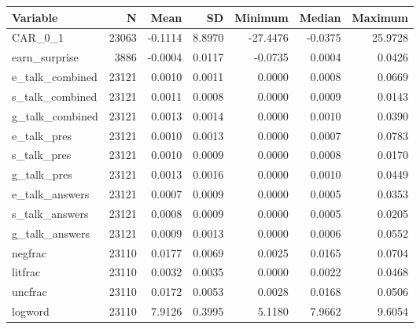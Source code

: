 \begin{tabular}{lrrrrrr}
\toprule
Variable & N & Mean & SD & Minimum & Median & Maximum \\
\midrule
CAR_0_1 & 23063 & -0.1114 & 8.8970 & -27.4476 & -0.0375 & 25.9728 \\
earn_surprise & 3886 & -0.0004 & 0.0117 & -0.0735 & 0.0004 & 0.0426 \\
e_talk_combined & 23121 & 0.0010 & 0.0011 & 0.0000 & 0.0008 & 0.0669 \\
s_talk_combined & 23121 & 0.0011 & 0.0008 & 0.0000 & 0.0009 & 0.0143 \\
g_talk_combined & 23121 & 0.0013 & 0.0014 & 0.0000 & 0.0010 & 0.0390 \\
e_talk_pres & 23121 & 0.0010 & 0.0013 & 0.0000 & 0.0007 & 0.0783 \\
s_talk_pres & 23121 & 0.0010 & 0.0009 & 0.0000 & 0.0008 & 0.0170 \\
g_talk_pres & 23121 & 0.0013 & 0.0016 & 0.0000 & 0.0010 & 0.0449 \\
e_talk_answers & 23121 & 0.0007 & 0.0009 & 0.0000 & 0.0005 & 0.0353 \\
s_talk_answers & 23121 & 0.0008 & 0.0009 & 0.0000 & 0.0005 & 0.0205 \\
g_talk_answers & 23121 & 0.0009 & 0.0013 & 0.0000 & 0.0006 & 0.0552 \\
negfrac & 23110 & 0.0177 & 0.0069 & 0.0025 & 0.0165 & 0.0704 \\
litfrac & 23110 & 0.0032 & 0.0035 & 0.0000 & 0.0022 & 0.0468 \\
uncfrac & 23110 & 0.0172 & 0.0053 & 0.0028 & 0.0168 & 0.0506 \\
logword & 23110 & 7.9126 & 0.3995 & 5.1180 & 7.9662 & 9.6054 \\
\bottomrule
\end{tabular}
